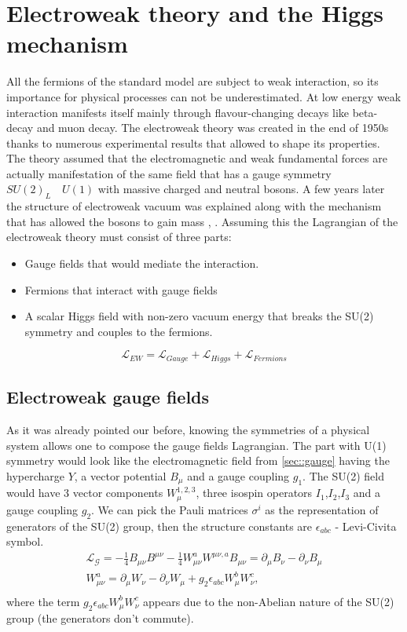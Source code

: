 \section{Electroweak theory and the Higgs mechanism}
All the fermions of the standard model are subject to weak interaction, so its importance for physical processes can not be underestimated. At low energy weak interaction manifests itself mainly through flavour-changing decays like beta-decay and muon decay. The electroweak theory was created in the end of 1950s\cite{Glashow:1959wxa} \cite{weinberg} \cite{Salam1959} thanks to numerous experimental results that allowed to shape its properties. The theory assumed that the electromagnetic and weak fundamental forces are actually manifestation of the same field that has a gauge symmetry $SU(2)_L \quad U(1)$ with massive charged and neutral bosons. A few years later the structure of electroweak vacuum was explained along with the mechanism that has allowed the bosons to gain mass \cite{brout}, \cite{higgs}. Assuming this the Lagrangian of the electroweak theory must consist of three parts\cite{Hollik_2006}: 
\begin{itemize}
	\item Gauge fields that would mediate the interaction.
	\item Fermions that interact with gauge fields
	\item A scalar Higgs field with non-zero vacuum energy that breaks the SU(2) symmetry and couples to the fermions.
\end{itemize}
 \begin{equation}
\mathcal{L}_{EW} = \mathcal{L}_{Gauge} +\mathcal{L}_{Higgs} +\mathcal{L}_{Fermions}
\end{equation}
\subsection{Electroweak gauge fields}
\label{sec::ewk}
As it was already pointed our before, knowing the symmetries of a physical system allows one to compose the gauge fields Lagrangian. The part with U(1) symmetry would look like the electromagnetic field from \ref{sec::gauge} having the hypercharge $Y$, a vector potential $B_{\mu}$ and a gauge coupling $g_1$. The SU(2) field would have 3 vector components $W^{1,2,3}_{\mu}$, three isospin operators $I_1$,$I_2$,$I_3$ and a gauge coupling $g_2$. We can pick the Pauli matrices $\sigma^{i}$ as the representation of generators of the SU(2) group, then the structure constants are $\epsilon_{abc}$ - Levi-Civita symbol.
\begin{equation}
\begin{array}{lcl} 
\mathcal{L_{G}} =  -\frac{1}{4}B_{\mu \nu}B^{\mu \nu} -\frac{1}{4}W^a_{\mu \nu}W^{\mu \nu,a} 
B_{\mu \nu}  =\partial_{\mu}B_{\nu} - \partial_{\nu}B_{\mu}\\ 
W^a_{\mu \nu}  =\partial_{\mu}W_{\nu} - \partial_{\nu}W_{\mu}+g_2\epsilon_{abc}W^b_{\mu}W^c_{\nu},\\ 
\end{array} 
\end{equation}
where the term $g_2\epsilon_{abc}W^b_{\mu}W^c_{\nu}$ appears due to the non-Abelian nature of the SU(2) group (the generators don't commute).


